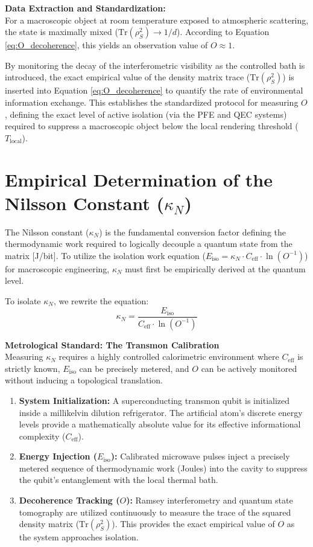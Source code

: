 \documentclass[12pt,a4paper]{article}
\begin{document}
\textbf{Data Extraction and Standardization:} \\
For a macroscopic object at room temperature exposed to atmospheric scattering, the state is maximally mixed ($\text{Tr}(\rho_S^2) \to 1/d$). According to Equation \ref{eq:O_decoherence}, this yields an observation value of $O \approx 1$. 

By monitoring the decay of the interferometric visibility as the controlled bath is introduced, the exact empirical value of the density matrix trace ($\text{Tr}(\rho_S^2)$) is inserted into Equation \ref{eq:O_decoherence} to quantify the rate of environmental information exchange. This establishes the standardized protocol for measuring $O$, defining the exact level of active isolation (via the PFE and QEC systems) required to suppress a macroscopic object below the local rendering threshold ($T_{\mathrm{local}}$).




\section{Empirical Determination of the Nilsson Constant ($\kappa_N$)}
The Nilsson constant ($\kappa_N$) is the fundamental conversion factor defining the thermodynamic work required to logically decouple a quantum state from the matrix [J/bit]. To utilize the isolation work equation ($E_{\mathrm{iso}} = \kappa_N \cdot C_{\mathrm{eff}} \cdot \ln(O^{-1})$) for macroscopic engineering, $\kappa_N$ must first be empirically derived at the quantum level. 

To isolate $\kappa_N$, we rewrite the equation:
$$ \kappa_N = \frac{E_{\mathrm{iso}}}{C_{\mathrm{eff}} \cdot \ln(O^{-1})} $$

\textbf{Metrological Standard: The Transmon Calibration} \\
Measuring $\kappa_N$ requires a highly controlled calorimetric environment where $C_{\mathrm{eff}}$ is strictly known, $E_{\mathrm{iso}}$ can be precisely metered, and $O$ can be actively monitored without inducing a topological translation.

\begin{enumerate}
    \item \textbf{System Initialization:} A superconducting transmon qubit is initialized inside a millikelvin dilution refrigerator. The artificial atom's discrete energy levels provide a mathematically absolute value for its effective informational complexity ($C_{\mathrm{eff}}$).
    \item \textbf{Energy Injection ($E_{\mathrm{iso}}$):} Calibrated microwave pulses inject a precisely metered sequence of thermodynamic work (Joules) into the cavity to suppress the qubit's entanglement with the local thermal bath.
    \item \textbf{Decoherence Tracking ($O$):} Ramsey interferometry and quantum state tomography are utilized continuously to measure the trace of the squared density matrix ($\text{Tr}(\rho_S^2)$). This provides the exact empirical value of $O$ as the system approaches isolation.
\end{enumerate}
\end{document}
